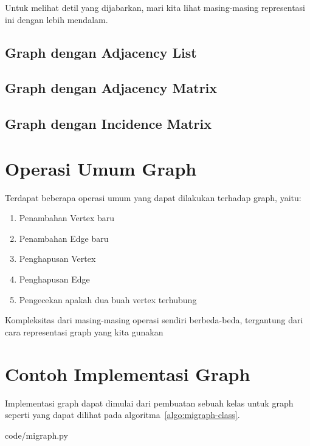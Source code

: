 Untuk melihat detil yang dijabarkan, mari kita lihat masing-masing representasi ini dengan lebih mendalam.

\subsection{Graph dengan Adjacency List}

\subsection{Graph dengan Adjacency Matrix}

\subsection{Graph dengan Incidence Matrix}

\section{Operasi Umum Graph}

Terdapat beberapa operasi umum yang dapat dilakukan terhadap graph, yaitu:

\begin{enumerate}
    \item Penambahan Vertex baru
    \item Penambahan Edge baru
    \item Penghapusan Vertex
    \item Penghapusan Edge
    \item Pengecekan apakah dua buah vertex terhubung
\end{enumerate}

Kompleksitas dari masing-masing operasi sendiri berbeda-beda, tergantung dari cara representasi graph yang kita gunakan

\section{Contoh Implementasi Graph}

Implementasi graph dapat dimulai dari pembuatan sebuah kelas untuk graph seperti yang dapat dilihat pada algoritma~\ref{algo:migraph-class}.


                {code/migraph.py}

